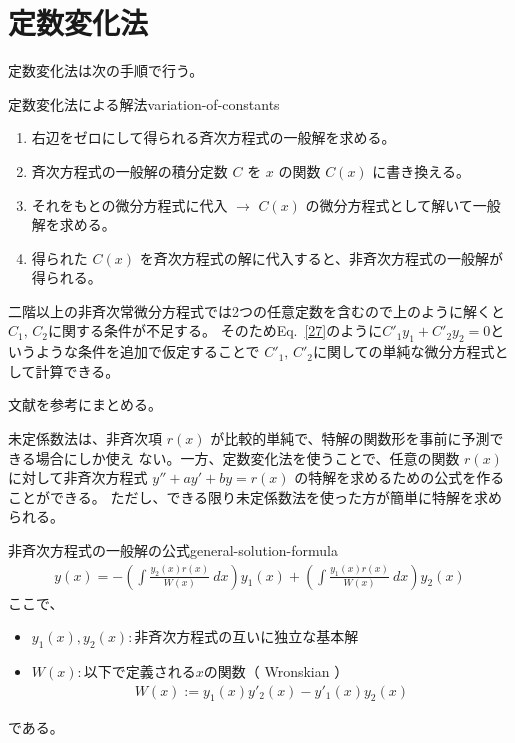 \newpage
\section{定数変化法}
定数変化法は次の手順で行う。
\begin{remark}{定数変化法による解法}{variation-of-constants}
  \begin{enumerate}[label=\arabic*.\:]
    \item 右辺をゼロにして得られる斉次方程式の一般解を求める。
    \item 斉次方程式の一般解の積分定数 $C$ を $x$ の関数 $C(x)$ に書き換える。
    \item それをもとの微分方程式に代入 $\longrightarrow$ $C(x)$ の微分方程式として解いて一般解を求める。
    \item 得られた $C(x)$ を斉次方程式の解に代入すると、非斉次方程式の一般解が得られる。
  \end{enumerate}
\end{remark}



二階以上の非斉次常微分方程式では2つの任意定数を含むので上のように解くと
$C_{1},\,C_{2}$に関する条件が不足する。
そのためEq.~\eqref{27}のように$C'_{1}y_{1}+C'_{2}y_{2}=0$というような条件を追加で仮定することで
$C'_{1},\,C'_{2}$に関しての単純な微分方程式として計算できる。

文献\cite{ref:teisuhenkaho}を参考にまとめる。

未定係数法は、非斉次項 $r(x)$ が比較的単純で、特解の関数形を事前に予測できる場合にしか使え
ない。一方、定数変化法を使うことで、任意の関数 $r(x)$ に対して非斉次方程式
$y'' + ay' + by = r(x)$ の特解を求めるための公式を作ることができる。
ただし、できる限り未定係数法を使った方が簡単に特解を求められる。

\begin{remark}{非斉次方程式の一般解の公式}{general-solution-formula}
  \begin{gather}
    y(x)
    = -\left( \int\frac{y_2({x})r({x})}{W({x})}\:d{x} \right) y_1(x)
    +  \left( \int\frac{y_1({x})r({x})}{W({x})}\:d{x} \right) y_2(x) \label{23}
  \end{gather}
  ここで、

  \begin{itemize}
    \item $y_1(x),y_2(x)\colon$非斉次方程式の互いに独立な基本解
    \item $W(x)\colon$以下で定義される$x$の関数（ Wronskian ）
    \begin{gather}
      W(x) := y_1(x)y'_2(x) - y'_1(x)y_2(x) \label{24}
    \end{gather}
  \end{itemize}
  である。
\end{remark}


